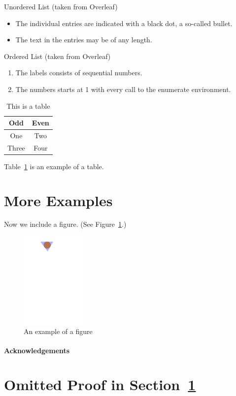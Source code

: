 \documentclass[a4paper]{article}
\theoremstyle{plain}
\theoremstyle{definition}
\begin{document}
	Unordered List (taken from Overleaf)
	\begin{itemize}
		\item The individual entries are indicated with a black dot, a so-called bullet.
		\item The text in the entries may be of any length.
	\end{itemize}

	Ordered List (taken from Overleaf)
	\begin{enumerate}
		\item The labels consists of sequential numbers.
		\item The numbers starts at 1 with every call to the enumerate environment.
	\end{enumerate}

	\begin{table}[ht]
		\centering
		\begin{tabular}{|c|c|}
			\hline
			\textbf{Odd} & \textbf{Even} \\
			\hline\hline
			One & Two \\
			\hline
			Three & Four \\
			\hline
		\end{tabular}
		\caption{This is a table}
		\label{tbl:1}
	\end{table}

	Table~\ref*{tbl:1} is an example of a table.
	
	\section{More Examples}
	\label{sec:examples}
	
	Now we include a figure.
	(See Figure~\ref{fig:example}.)
	\begin{figure}[ht]
		\centering
		\includegraphics[width=0.3\textwidth]{example}
		\caption{An example of a figure}
		\label{fig:example}
	\end{figure}
	
	\paragraph{Acknowledgements} \lipsum[6]
	
	
	
	\appendix
	
	\section{Omitted Proof in Section~\ref{sec:examples}}
	\label{app:1}
	
	\lipsum[7]
	
\end{document}
